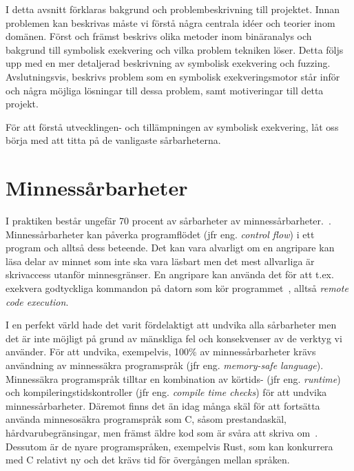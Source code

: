 I detta avsnitt förklaras bakgrund och problembeskrivning till projektet. Innan
problemen kan beskrivas måste vi förstå några centrala idéer och teorier inom
domänen. Först och främst beskrivs olika metoder inom binäranalys och bakgrund
till symbolisk exekvering och vilka problem tekniken löser. Detta följs upp med
en mer detaljerad beskrivning av symbolisk exekvering och fuzzing.
Avslutningsvis, beskrivs problem som en symbolisk exekveringsmotor står inför
och några möjliga lösningar till dessa problem, samt motiveringar till detta
projekt.

För att förstå utvecklingen- och tillämpningen av symbolisk exekvering, låt
oss börja med att titta på de vanligaste sårbarheterna.

\section{Minnessårbarheter}
I praktiken består ungefär 70 procent av sårbarheter av
minnessårbarheter.~\cite{miller19}. Minnessårbarheter kan påverka programflödet
(jfr eng. \emph{control flow}) i ett program och alltså dess beteende. Det kan
vara alvarligt om en angripare kan läsa delar av minnet som inte ska vara
läsbart men det mest allvarliga är skrivaccess utanför minnesgränser. En
angripare kan använda det för att t.ex. exekvera godtyckliga kommandon på
datorn som kör programmet~\cite{computer_security_cs161}, alltså \emph{remote
code execution}.

I en perfekt värld hade det varit fördelaktigt att undvika alla sårbarheter men
det är inte möjligt på grund av mänskliga fel och konsekvenser av de verktyg vi
använder. För att undvika, exempelvis, 100\% av minnessårbarheter krävs
användning av minnessäkra programspråk (jfr eng. \emph{memory-safe language}).
Minnessäkra programspråk tilltar en kombination av körtids- (jfr eng.
\emph{runtime}) och kompileringstidskontroller (jfr eng. \emph{compile
time checks}) för att undvika minnessårbarheter. Däremot finns det än idag
många skäl för att fortsätta använda minnesosäkra programspråk som C, såsom
prestandaskäl, hårdvarubegränsingar, men främst äldre kod som är svåra att
skriva om~\cite{computer_security_cs161}. Dessutom är de nyare programspråken,
exempelvis Rust, som kan konkurrera med C relativt ny och det krävs tid för
övergången mellan språken.

